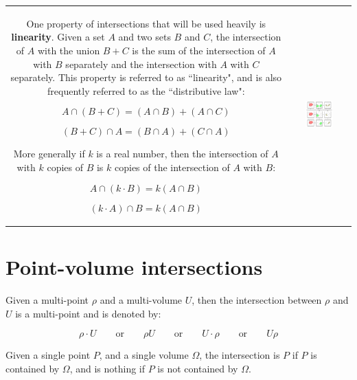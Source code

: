 \documentclass{book}
\begin{document}
\begin{tabular}{cc}
\parbox{0.5\textwidth}{
One property of intersections that will be used heavily is {\bf linearity}. Given a set \(A\) and two sets \(B\) and \(C\), the intersection of \(A\) with the union \(B + C\) is the sum of the intersection of \(A\) with \(B\) separately and the intersection with \(A\) with \(C\) separately. This property is referred to as ``linearity", and is also frequently referred to as the ``distributive law":

\[A \cap (B + C) = (A \cap B) + (A \cap C)\]

\[(B + C) \cap A = (B \cap A) + (C \cap A)\]

More generally if \(k\) is a real number, then the intersection of \(A\) with \(k\) copies of \(B\) is \(k\) copies of the intersection of \(A\) with \(B\):

\[A \cap (k \cdot B) = k(A \cap B)\]

\[(k \cdot A) \cap B = k(A \cap B)\]

} & \parbox{0.5\textwidth}{
\includegraphics[width = 0.5\textwidth]{Intersections/intersection_distributive_law}
}
\end{tabular}





\section{Point-volume intersections}

Given a multi-point \(\rho\) and a multi-volume \(U\), then the intersection between \(\rho\) and \(U\) is a multi-point and is denoted by:

\[\rho \cdot U \quad\quad\text{or}\quad\quad \rho U \quad\quad\text{or}\quad\quad U \cdot \rho \quad\quad\text{or}\quad\quad U \rho\]

Given a single point \(P\), and a single volume \(\Omega\), the intersection is \(P\) if \(P\) is contained by \(\Omega\), and is nothing if \(P\) is not contained by \(\Omega\). 
\end{document}
